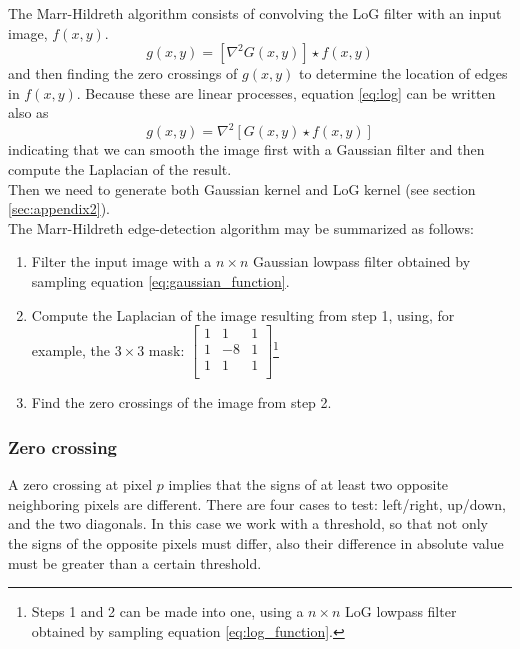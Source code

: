 \documentclass{ipol}
\numberwithin{equation}{section}
\numberwithin{table}{section}
\numberwithin{figure}{section}
\begin{document}
The Marr-Hildreth algorithm consists of convolving the LoG filter with an input image, $f(x,y)$.
\begin{equation}\label{eq:log}
  g(x,y) = [\nabla^2G(x,y)]\star f(x,y)
\end{equation}
and then finding the zero crossings of $g(x,y)$ to determine the location of edges in $f(x,y)$. 
Because these are linear processes, equation \ref{eq:log} can be written also as
\begin{equation}
  g(x,y) = \nabla^2[G(x,y)\star f(x,y)]
\end{equation}
indicating that we can smooth the image first with a Gaussian filter and then compute the Laplacian of the result.\\

Then we need to generate both Gaussian kernel and LoG kernel (see section \ref{sec:appendix2}).\\

The Marr-Hildreth edge-detection algorithm may be summarized as follows:
\begin{enumerate}
	\item Filter the input image with a $n \times n$ Gaussian lowpass filter obtained by sampling equation \ref{eq:gaussian_function}.
	\item Compute the Laplacian of the image resulting from step 1, using, for example, the $3\times3$ mask:
			$\begin{bmatrix}
			1 &  1 & 1 \\
			1 & -8 & 1 \\
			1 &  1 & 1 \\
			\end{bmatrix}$\footnote{Steps 1 and 2 can be made into one, using a $n\times n$ LoG lowpass filter obtained by sampling equation \ref{eq:log_function}.}
	\item Find the zero crossings of the image from step 2.
\end{enumerate}

\subsubsection{Zero crossing}

A zero crossing at pixel $p$ implies that the signs of at least two opposite neighboring pixels are 
different. There are four cases to test: left/right, up/down, and the two diagonals. In this case 
we work with a threshold, so that not only the signs of the opposite pixels must differ, also their 
difference in absolute value must be greater than a certain threshold.\\
\end{document}
